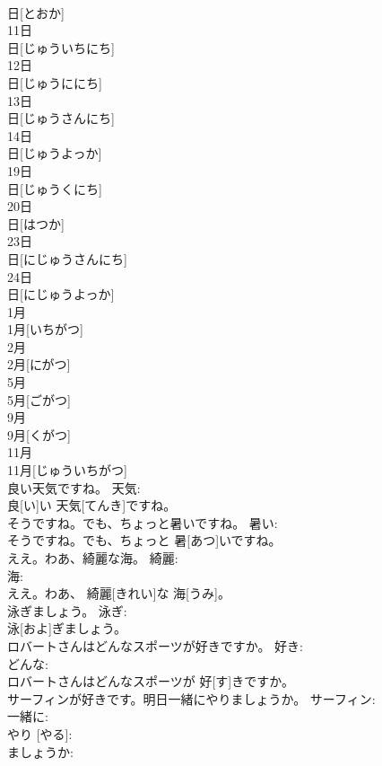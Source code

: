 \documentclass[8pt]{extreport}
\begin{document}
\begin{CJK}{UTF8}{min}
\\	日[とおか]		
\\	11日	
\\	日[じゅういちにち]		
\\	12日	
\\	日[じゅうににち]		
\\	13日	
\\	日[じゅうさんにち]		
\\	14日	
\\	日[じゅうよっか]		
\\	19日	
\\	日[じゅうくにち]		
\\	20日	
\\	日[はつか]		
\\	23日	
\\	日[にじゅうさんにち]		
\\	24日	
\\	日[にじゅうよっか]		
\\	1月	
\\	1月[いちがつ]		
\\	2月	
\\	2月[にがつ]		
\\	5月	
\\	5月[ごがつ]		
\\	9月	
\\	9月[くがつ]		
\\	11月	
\\	11月[じゅういちがつ]		
\\	良い天気ですね。	天気: 
\\	良[い]い 天気[てんき]ですね。		
\\	そうですね。でも、ちょっと暑いですね。	暑い: 
\\	そうですね。でも、ちょっと 暑[あつ]いですね。		
\\	ええ。わあ、綺麗な海。	綺麗: 
\\	海: 
\\	ええ。わあ、 綺麗[きれい]な 海[うみ]。		
\\	泳ぎましょう。	泳ぎ: 
\\	泳[およ]ぎましょう。		
\\	ロバートさんはどんなスポーツが好きですか。	好き: 
\\	どんな: 
\\	ロバートさんはどんなスポーツが 好[す]きですか。		
\\	サーフィンが好きです。明日一緒にやりましょうか。	サーフィン: 
\\	一緒に: 
\\	やり [やる]: 
\\	ましょうか: 

\end{CJK}
\end{document}
